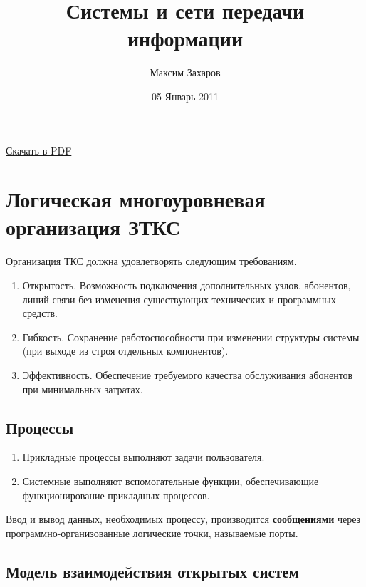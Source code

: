 \documentclass[12pt, russian, oneside, article]{ncc}
\begin{document}
\title{Системы и сети передачи информации}
\author{Максим Захаров}
\date{05 Январь 2011}
\maketitle

\setcounter{tocdepth}{3}
\tableofcontents
\vspace*{1cm}

\href{file:///home/maxim/Documents/Git/zamal.github.com/pdf/SiSPI_Lectures.pdf}{Скачать в PDF}

\section{Логическая многоуровневая организация ЗТКС}
\label{sec-1}


Организация ТКС должна удовлетворять следующим требованиям.
\begin{enumerate}
\item Открытость. Возможность подключения дополнительных узлов, абонентов, линий связи без изменения существующих технических и программных средств.
\item Гибкость. Сохранение работоспособности при изменении структуры системы (при выходе из строя отдельных компонентов).
\item Эффективность. Обеспечение требуемого качества обслуживания абонентов при минимальных затратах.
\end{enumerate}
  
\subsection{Процессы}
\label{sec-1_1}


\begin{enumerate}
\item Прикладные процессы выполняют задачи пользователя.
\item Системные выполняют вспомогательные функции, обеспечивающие функционирование прикладных процессов.
\end{enumerate}

Ввод и вывод данных, необходимых процессу, производится \textbf{сообщениями} через программно-организованные логические точки, называемые порты.
\subsection{Модель взаимодействия открытых систем}
\label{sec-1_2}
\end{document}
